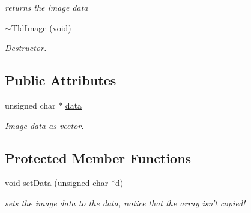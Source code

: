\begin{DoxyCompactItemize}
\begin{DoxyCompactList}\small\item\em returns the image data \end{DoxyCompactList}\item 
\hypertarget{class_tld_image_a8aba8a60891c75bdbcecf45e00302be3}{\hyperlink{class_tld_image_a8aba8a60891c75bdbcecf45e00302be3}{$\sim$\-Tld\-Image} (void)}\label{class_tld_image_a8aba8a60891c75bdbcecf45e00302be3}

\begin{DoxyCompactList}\small\item\em \-Destructor. \end{DoxyCompactList}\end{DoxyCompactItemize}
\subsection*{\-Public \-Attributes}
\begin{DoxyCompactItemize}
\item 
\hypertarget{class_tld_image_aaa5e8f16981f93134112740d246af688}{unsigned char $\ast$ \hyperlink{class_tld_image_aaa5e8f16981f93134112740d246af688}{data}}\label{class_tld_image_aaa5e8f16981f93134112740d246af688}

\begin{DoxyCompactList}\small\item\em \-Image data as vector. \end{DoxyCompactList}\end{DoxyCompactItemize}
\subsection*{\-Protected \-Member \-Functions}
\begin{DoxyCompactItemize}
\item 
\hypertarget{class_tld_image_a54f49a4edd16643cc21e6313249f01b6}{void \hyperlink{class_tld_image_a54f49a4edd16643cc21e6313249f01b6}{set\-Data} (unsigned char $\ast$d)}\label{class_tld_image_a54f49a4edd16643cc21e6313249f01b6}

\begin{DoxyCompactList}\small\item\em sets the image data to the data, notice that the array isn't copied! \end{DoxyCompactList}\end{DoxyCompactItemize}


